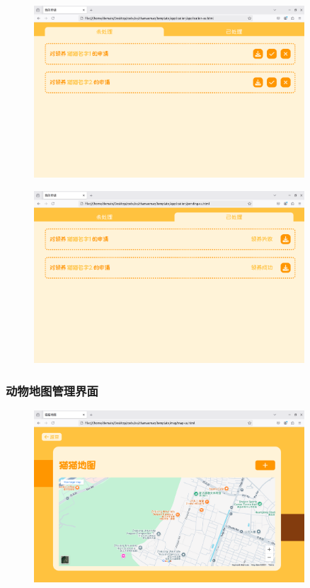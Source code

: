 \documentclass[12pt,a4paper,UTF8]{article}
\begin{document}
\begin{figure}[H]
  \centering
  \includegraphics[width=0.9\textwidth]{figures/AdoptionApply3.png}
\end{figure}

\begin{figure}[H]
  \centering
  \includegraphics[width=0.9\textwidth]{figures/AdoptionApply4.png}
\end{figure}

\subsubsection{动物地图管理界面}

\begin{figure}[H]
  \centering
  \includegraphics[width=0.9\textwidth]{figures/AdministratorMap.png}
\end{figure}
\end{document}
